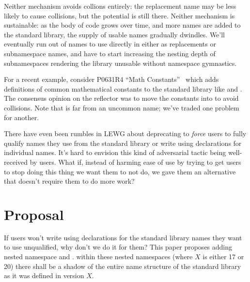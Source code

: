 Neither mechanism avoids collions entirely: the replacement name may be less
likely to cause collisions, but the potential is still there. Neither mechanism
is sustainable: as the body of \Cpp{} code grows over time, and more names are
added to the standard library, the supply of usable names gradually dwindles.
We'll eventually run out of names to use directly in  either as
replacements or subnamespace names, and have to start increasing the nesting
depth of subnamespaces rendering the library unusable without namespace
gymnastics.

For a recent example, consider P0631R4 ``Math Constants''~\cite{P0631R4} which
adds definitions of common mathematical constants to the standard library like
 and . The consensus opinion on the reflector was to move the
constants into  to avoid collisions. Note that  is
far from an uncommon name; we've traded one problem for another.

There have even been rumbles in LEWG about deprecating
 to \emph{force} users to fully qualify names they
use from the standard library or write using declarations for individual names.
It's hard to envision this kind of adversarial tactic being well-received by
users. What if, instead of harming ease of use by trying to get users to stop
doing this thing we want them to not do, we gave them an alternative that
doesn't require them to do more work?


\chapter{Proposal}
If users won't write using declarations for the standard library names they
want to use unqualified, why don't we do it for them? This paper proposes adding
nested namespace  and . within these
nested namespaces  (where $X$ is either 17 or 20) there
shall be a shadow of the entire name structure of the standard library as it was
defined in \Cpp{} version $X$.

